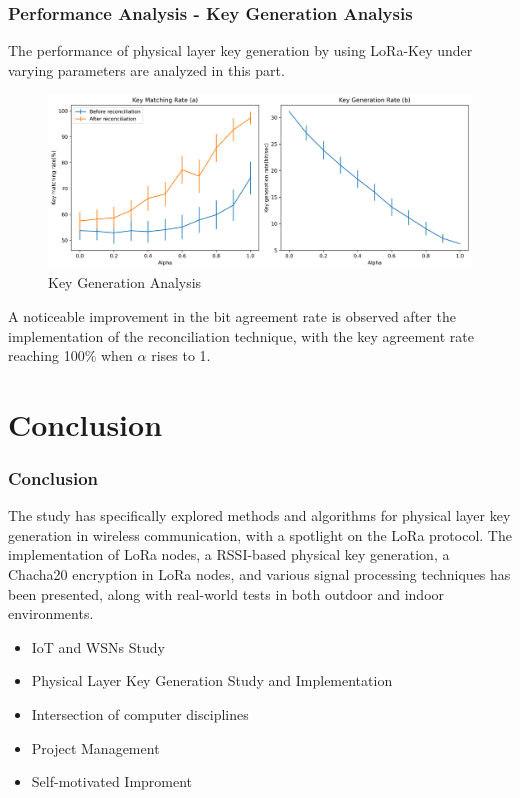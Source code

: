 \documentclass{beamer}
\begin{document}
\begin{frame}
  \frametitle{Performance Analysis -  Key Generation Analysis}

  The performance of physical layer key generation by using LoRa-Key under varying parameters are analyzed in this part.
  \begin{figure}
    \centering
    \includegraphics[width=0.8\linewidth]{../figures/keygenanalyst.png}
    \caption{Key Generation Analysis}
    \label{keygenanalyst}
  \end{figure}
A noticeable improvement in the bit agreement rate is observed after the implementation of the reconciliation technique, with the key agreement rate reaching 100$\%$ when \(\alpha\) rises to 1. 

\end{frame}

\section{Conclusion}

\begin{frame}
  \frametitle{Conclusion}
  The study has specifically explored methods and algorithms for physical layer key generation in wireless communication, with a spotlight on the LoRa protocol. The implementation of LoRa nodes, a RSSI-based physical key generation, a Chacha20 encryption in LoRa nodes, and various signal processing techniques has been presented, along with real-world tests in both outdoor and indoor environments.
\vspace{0.2in}
  \begin{itemize}
    \item IoT and WSNs Study
    \item Physical Layer Key Generation Study and Implementation
    \item Intersection of computer disciplines
    \item Project Management
    \item Self-motivated Improment
    \end{itemize}
\end{frame}
\end{document}
